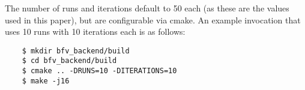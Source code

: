The number of runs and iterations default to 50 each (as these are the values used in this paper), but are configurable via cmake. An example invocation that uses 10 runs with 10 iterations each is as follows:

\begin{verbatim}
    $ mkdir bfv_backend/build
    $ cd bfv_backend/build
    $ cmake .. -DRUNS=10 -DITERATIONS=10
    $ make -j16
\end{verbatim}


